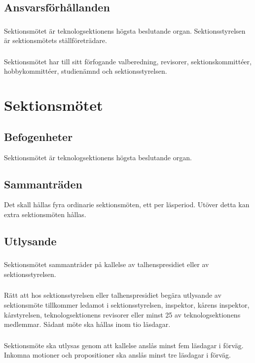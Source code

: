 \documentclass[a4paper]{dtek}
\begin{document}
\subsection{Ansvarsförhållanden}
\subsubsection{}
Sektionsmötet är teknologsektionens högsta beslutande organ. Sektionsstyrelsen är sektionsmötets ställföreträdare.
\subsubsection{}
Sektionsmötet har till sitt förfogande valberedning, revisorer, sektionskommittéer, hobbykommittéer, studienämnd och sektionsstyrelsen.
\newpage

\section{Sektionsmötet}
\subsection{Befogenheter}
Sektionsmötet är teknologsektionens högsta beslutande organ.
\subsection{Sammanträden}
Det skall hållas fyra ordinarie sektionsmöten, ett per läsperiod. Utöver detta kan extra sektionsmöten hållas.
\subsection{Utlysande}
\subsubsection{}
Sektionsmötet sammanträder på kallelse av talhenspresidiet eller av sektionsstyrelsen.
\subsubsection{}
Rätt att hos sektionsstyrelsen eller talhenspresidiet begära utlysande av sektionsmöte tillkommer ledamot i sektionsstyrelsen, inspektor, kårens inspektor, kårstyrelsen, teknologsektionens revisorer eller minst 25 av teknologsektionens medlemmar. Sådant möte ska hållas inom tio läsdagar.
\subsubsection{}
\label{sec:sektionsmote_utlysande}
Sektionsmöte ska utlysas genom att kallelse anslås minst fem läsdagar i förväg.
Inkomna motioner och propositioner ska anslås minst tre läsdagar i förväg.
\end{document}
